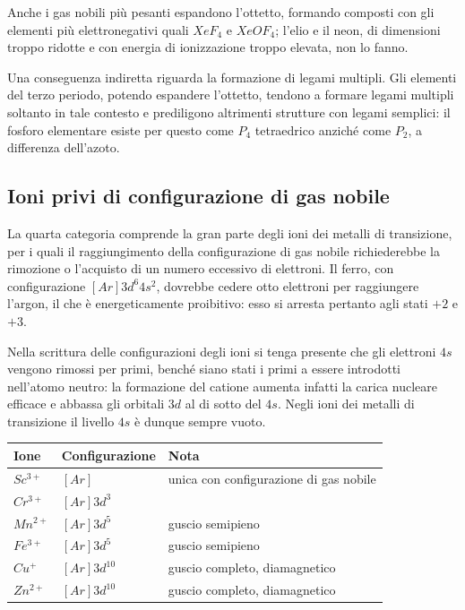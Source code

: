 Anche i gas nobili più pesanti espandono l'ottetto, formando composti con gli elementi più elettronegativi quali $XeF_4$ e $XeOF_4$; l'elio e il neon, di dimensioni troppo ridotte e con energia di ionizzazione troppo elevata, non lo fanno.

Una conseguenza indiretta riguarda la formazione di legami multipli. Gli elementi del terzo periodo, potendo espandere l'ottetto, tendono a formare legami multipli soltanto in tale contesto e prediligono altrimenti strutture con legami semplici: il fosforo elementare esiste per questo come $P_4$ tetraedrico anziché come $P_2$, a differenza dell'azoto.

\subsection{Ioni privi di configurazione di gas nobile}

La quarta categoria comprende la gran parte degli ioni dei metalli di transizione, per i quali il raggiungimento della configurazione di gas nobile richiederebbe la rimozione o l'acquisto di un numero eccessivo di elettroni. Il ferro, con configurazione $[Ar]3d^6 4s^2$, dovrebbe cedere otto elettroni per raggiungere l'argon, il che è energeticamente proibitivo: esso si arresta pertanto agli stati $+2$ e $+3$.

Nella scrittura delle configurazioni degli ioni si tenga presente che gli elettroni $4s$ vengono rimossi per primi, benché siano stati i primi a essere introdotti nell'atomo neutro: la formazione del catione aumenta infatti la carica nucleare efficace e abbassa gli orbitali $3d$ al di sotto del $4s$. Negli ioni dei metalli di transizione il livello $4s$ è dunque sempre vuoto.

\begin{center}
    \begin{tabular}{lll}
        \toprule
        Ione & Configurazione & Nota \\
        \midrule
        $Sc^{3+}$ & $[Ar]$          & unica con configurazione di gas nobile \\
        $Cr^{3+}$ & $[Ar]3d^3$      & \\
        $Mn^{2+}$ & $[Ar]3d^5$      & guscio semipieno \\
        $Fe^{3+}$ & $[Ar]3d^5$      & guscio semipieno \\
        $Cu^{+}$  & $[Ar]3d^{10}$   & guscio completo, diamagnetico \\
        $Zn^{2+}$ & $[Ar]3d^{10}$   & guscio completo, diamagnetico \\
        \bottomrule
    \end{tabular}
\end{center}

